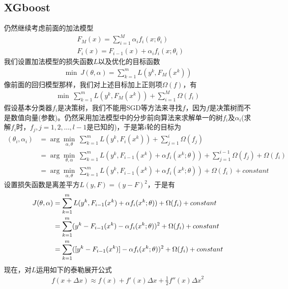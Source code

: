       \subsection{XGboost}
          \par
          仍然继续考虑前面的加法模型
          \begin{align*}
          & F_M(x) = \sum_{i=1}^M\alpha_i f_i(x;\theta_i)\\
          & F_i(x) = F_{i-1}(x)+\alpha_i f_i(x;\theta_i)
          \end{align*}
          我们设置加法模型的损失函数$L$以及优化的目标函数
          \begin{align*}
          \min\ J(\theta,\alpha) = \sum_{k=1}^m L(y^k,F_M(x^k))
          \end{align*}
          像前面的回归模型那样，我们对上述目标加上正则项$\Omega(f)$，有
          \begin{align*}
          \min \ \sum_{k=1}^m L(y^k,F_M(x^k))+\sum_{i=1}^M\Omega(f_i)
          \end{align*}
          假设基本分类器$f_i$是决策树，我们不能用SGD等方法来寻找$f$，因为$f$是决策树而不是数值向量(参数)。仍然采用加法模型中的分步前向算法来求解单一的树$f_i$及$\alpha_i$(求解$f_i$时，$f_j,j=1,2,\dots,l-1$是已知的)，于是第$i$轮的目标为
          \begin{align*}
          (\theta_i,\alpha_i) & = \arg\min_{\alpha,\theta} \ \sum_{k=1}^m L(y^k,F_i(x^k)) + \sum_{j=1}^i \Omega(f_j)\\
          & = \arg\min_{\theta,\alpha}\ \sum_{k=1}^m L(y^k,F_{i-1}(x^k)+\alpha f_i(x^k;\theta)) +\sum_{j=1}^{i-1}\Omega(f_j)+\Omega(f_i)\\
          & = \arg\min_{\alpha,\theta} \ \sum_{k=1}^m L(y^k,F_{i-1}(x^k)+\alpha f_i(x^k;\theta))+\Omega(f_i)+constant
          \end{align*}
          设置损失函数是离差平方$L(y,F) = (y-F)^2$，于是有
          \begin{align}
          \label{XGboost目标}
          J(\theta,\alpha) & = \sum_{k=1}^m L(y^k,F_{i-1}(x^k)+\alpha f_i(x^k;\theta))+\Omega(f_i)+constant\\
          & = \sum_{k=1}^m (y^k - F_{i-1}(x^k)- \alpha f_i(x^k;\theta))^2 +\Omega (f_i)+constant\notag \\
          &= \sum_{k=1}^m([y^k-F_{i-1}(x^k)] - \alpha f_i(x^k;\theta))^2+\Omega(f_i)+constant\notag
          \end{align}
          现在，对$L$运用如下的泰勒展开公式
          \begin{align}
          \label{XGboost的泰勒公式}
          f(x+\Delta x) \approx f(x)+f'(x)\Delta x + \frac{1}{2}f''(x){\Delta x}^2
          \end{align}
